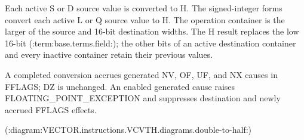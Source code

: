 Each active S or D source value is converted to H. The signed-integer forms
convert each active L or Q source value to H. The operation container is the
larger of the source and 16-bit destination widths. The H result replaces the
low 16-bit (:term:base.terms.field:); the other bits of an active destination container and every
inactive container retain their previous values.

A completed conversion accrues generated NV, OF, UF, and NX causes in FFLAGS;
DZ is unchanged. An enabled generated cause raises FLOATING\_POINT\_EXCEPTION and
suppresses destination and newly accrued FFLAGS effects.

(:diagram:VECTOR.instructions.VCVTH.diagrams.double-to-half:)
